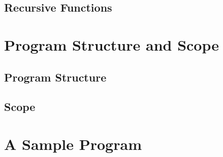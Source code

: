 \documentclass{article}
\begin{document}
\subsection{Recursive Functions}

\section{Program Structure and Scope}

\subsection{Program Structure}

\subsection{Scope}

\section{A Sample Program}
\end{document}
